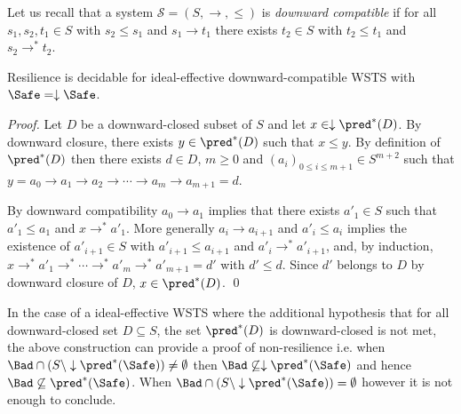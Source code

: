 Let us recall that a system $\mathscr{S}=(S,\rightarrow, \leq)$ is \emph{downward compatible} if
for all $s_1, s_2, t_1 \in S$ with
$s_2 \leq s_1$ and $s_1 \to t_1$
there
exists $t_2 \in S$ with
$t_2 \leq t_1$ and $s_2 \to^* t_2$.

\begin{corollary}
{\sc Resilience} is decidable for ideal-effective downward-compatible WSTS with 
$\Safe=\downarrow \Safe$.
\end{corollary}

\begin{proof}


Let $D$ be a downward-closed subset of $S$
and let $x \in \downarrow \pred^*(D)$.
By downward closure, there exists
$y \in \pred^*(D)$ 
such that $x \leq y$.
By definition of $\pred^*(D)$ then there exists 
$d \in D$, $m\geq 0$ and $(a_i)_{0 \leq i \leq m+1} \in S^{m+2}$ such that
$y = a_0 \to a_1 \to a_2 \to \cdots \to a_m \to a_{m+1} = d$.

By downward compatibility $a_0 \to a_1$
implies that there exists $a'_1 \in S$ such that $a'_1 \leq a_1$ and
$x \to^* a'_1$.
More generally $a_i \to a_{i+1}$ and
$a'_i\leq a_i$ implies the existence of $a'_{i+1} \in S$ with $a'_{i+1} \leq a_{i+1}$ and
$a'_i \to^* a'_{i+1}$,
and, by induction,
 $x \to^* a'_1 \to^* \cdots \to^* a'_{m} \to^* a'_{m+1} = d'$
with $d' \leq d$.
Since
$d'$ 
belongs to $D$ by downward closure of $D$, $x \in \pred^*(D)$. \qed
\end{proof}

In the case
of a ideal-effective WSTS 
where
the additional hypothesis that
for all downward-closed set $D \subseteq S$, the set $\pred^*(D)$ is downward-closed
is not met,
the above construction
can provide a proof
of non-resilience
i.e. when
$\Bad \cap (S \setminus \downarrow\pred^*(\Safe)) \neq \emptyset$
then
$\Bad \not\subseteq \downarrow\pred^*(\Safe)$
and hence
$\Bad \not\subseteq \pred^*(\Safe)$.
When $\Bad \cap (S \setminus \downarrow\pred^*(\Safe)) = \emptyset$
however
it is not enough to conclude.




